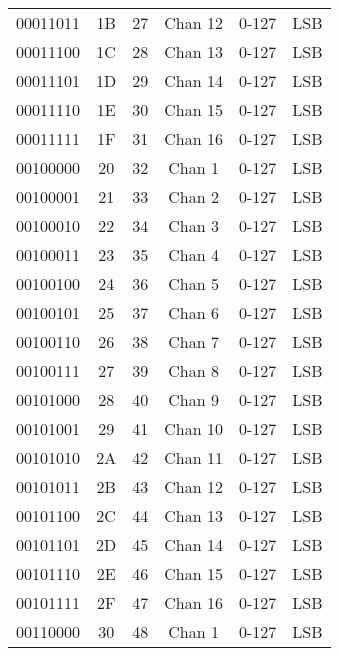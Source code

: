 \begin{center}
\begin{supertabular}{| c | c | c | c | c | c |}
                00011011 & 1B & 27  & Chan 12  & 0-127 & LSB \\
             00011100 & 1C & 28  & Chan 13  & 0-127 & LSB \\
                00011101 & 1D & 29  & Chan 14  & 0-127 & LSB \\
             00011110 & 1E & 30  & Chan 15  & 0-127 & LSB \\
                00011111 & 1F & 31  & Chan 16  & 0-127 & LSB \\
             00100000 & 20 & 32  & Chan 1   & 0-127 & LSB \\
                00100001 & 21 & 33  & Chan 2   & 0-127 & LSB \\
             00100010 & 22 & 34  & Chan 3   & 0-127 & LSB \\
                00100011 & 23 & 35  & Chan 4   & 0-127 & LSB \\
             00100100 & 24 & 36  & Chan 5   & 0-127 & LSB \\
                00100101 & 25 & 37  & Chan 6   & 0-127 & LSB \\
             00100110 & 26 & 38  & Chan 7   & 0-127 & LSB \\
                00100111 & 27 & 39  & Chan 8   & 0-127 & LSB \\
             00101000 & 28 & 40  & Chan 9   & 0-127 & LSB \\
                00101001 & 29 & 41  & Chan 10  & 0-127 & LSB \\
             00101010 & 2A & 42  & Chan 11  & 0-127 & LSB \\
                00101011 & 2B & 43  & Chan 12  & 0-127 & LSB \\
             00101100 & 2C & 44  & Chan 13  & 0-127 & LSB \\
                00101101 & 2D & 45  & Chan 14  & 0-127 & LSB \\
             00101110 & 2E & 46  & Chan 15  & 0-127 & LSB \\
                00101111 & 2F & 47  & Chan 16  & 0-127 & LSB \\
             00110000 & 30 & 48  & Chan 1   & 0-127 & LSB \\

\end{supertabular}
\end{center}

